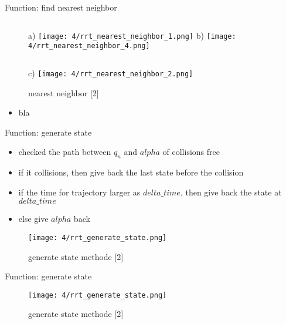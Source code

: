 \documentclass[%
  professionalfonts,%
  xcolor={%
    usenames,%
    dvipsnames,%
    svgnames,%
    table,%
    hyperref%
  }%
]{beamer}
\begin{document}
\begin{frame}{Function: find nearest neighbor}
	\begin{figure}[h]
		\footnotesize
		\begin{columns}
			\vspace{-50pt}
			a)
			\texttt{[image: 4/rrt\_nearest\_neighbor\_1.png]}
			\vspace{-50pt}
			b)
			\texttt{[image: 4/rrt\_nearest\_neighbor\_4.png]}
		\end{columns}
		\vspace{15pt}
		\begin{columns}
			\column[c]{.25\textwidth}
			\column[c]{.01\textwidth}
			\vspace{-50pt}
			c)
			\column[c]{.49\textwidth}
			\texttt{[image: 4/rrt\_nearest\_neighbor\_2.png]}
			\column[c]{.25\textwidth}
		\end{columns}
		\caption{nearest neighbor [2]}
		\label{fig:generate state methode}
	\end{figure}
	\vspace{-35pt}
	\begin{itemize}
		\item bla
	\end{itemize}
\end{frame}

\begin{frame}{Function: generate state}
	\begin{itemize}
		\item checked the path between $q_n$ and $alpha$ of collisions free
		\item if it collisions, then give back the last state before the collision
		\item if the time for trajectory larger as $delta\_time$, then give back the state at $delta\_time$
		\item else give $alpha$ back
	\end{itemize}
	
	\begin{figure}[h]
		\texttt{[image: 4/rrt\_generate\_state.png]}
		\caption{generate state methode [2]}
		\label{fig:generate state methode}
	\end{figure}
\end{frame}

\begin{frame}{Function: generate state}
	\begin{figure}[h]
		\centering
		\texttt{[image: 4/rrt\_generate\_state.png]}
		\caption{generate state methode [2]}
		\label{fig:generate state methode}
	\end{figure}
\end{frame}
\end{document}
